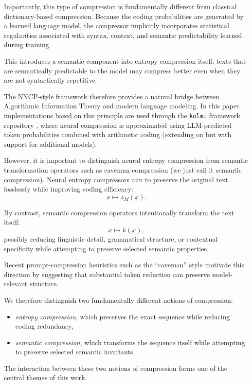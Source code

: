 Importantly, this type of compression is fundamentally different from classical dictionary-based compression. Because the coding probabilities are generated by a learned language model, the compressor implicitly incorporates statistical regularities associated with syntax, context, and semantic predictability learned during training.

This introduces a semantic component into entropy compression itself:
texts that are semantically predictable to the model may compress better even when they are not syntactically repetitive.

The NNCP-style framework therefore provides a natural bridge between Algorithmic Information Theory and modern language modeling. In this paper, implementations based on this principle are used through the \texttt{kolmi} framework repository \cite{yakimovich2026kolmi}, where neural compression is approximated using LLM-predicted token probabilities combined with arithmetic coding (extending on \cite{bellard2024nncp} but with support for additional models).

However, it is important to distinguish neural entropy compression from semantic transformation operators such as caveman compression (we just call it semantic compression). Neural entropy compressors aim to preserve the original text losslessly while improving coding efficiency:
\[
x \mapsto z_M(x).
\]

By contrast, semantic compression operators intentionally transform the text itself:
\[
x \mapsto k(x),
\]
possibly reducing linguistic detail, grammatical structure, or contextual specificity while attempting to preserve selected semantic properties.

Recent prompt-compression heuristics such as the ``caveman'' style \cite{brussee2026caveman} motivate this direction by suggesting that substantial token reduction can preserve model-relevant structure.

We therefore distinguish two fundamentally different notions of compression:
\begin{itemize}
    \item \textit{entropy compression}, which preserves the exact sequence while reducing coding redundancy,
    \item \textit{semantic compression}, which transforms the sequence itself while attempting to preserve selected semantic invariants.
\end{itemize}

The interaction between these two notions of compression forms one of the central themes of this work.

